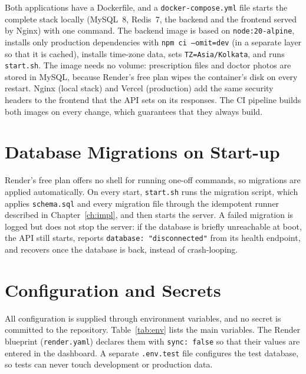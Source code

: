 Both applications have a Dockerfile, and a \texttt{docker-compose.yml} file starts the complete stack locally (MySQL~8, Redis~7, the backend and the frontend served by Nginx) with one command. The backend image is based on \texttt{node:20-alpine}, installs only production dependencies with \texttt{npm ci --omit=dev} (in a separate layer so that it is cached), installs time-zone data, sets \texttt{TZ=Asia/Kolkata}, and runs \texttt{start.sh}. The image needs no volume: prescription files and doctor photos are stored in MySQL, because Render's free plan wipes the container's disk on every restart. Nginx (local stack) and Vercel (production) add the same security headers to the frontend that the API sets on its responses. The CI pipeline builds both images on every change, which guarantees that they always build.

\FloatBarrier
\section{Database Migrations on Start-up}

Render's free plan offers no shell for running one-off commands, so migrations are applied automatically. On every start, \texttt{start.sh} runs the migration script, which applies \texttt{schema.sql} and every migration file through the idempotent runner described in Chapter~\ref{ch:impl}, and then starts the server. A failed migration is logged but does not stop the server: if the database is briefly unreachable at boot, the API still starts, reports \texttt{database: "disconnected"} from its health endpoint, and recovers once the database is back, instead of crash-looping.

\FloatBarrier
\section{Configuration and Secrets}

All configuration is supplied through environment variables, and no secret is committed to the repository. Table~\ref{tab:env} lists the main variables. The Render blueprint (\texttt{render.yaml}) declares them with \texttt{sync: false} so that their values are entered in the dashboard. A separate \texttt{.env.test} file configures the test database, so tests can never touch development or production data.

